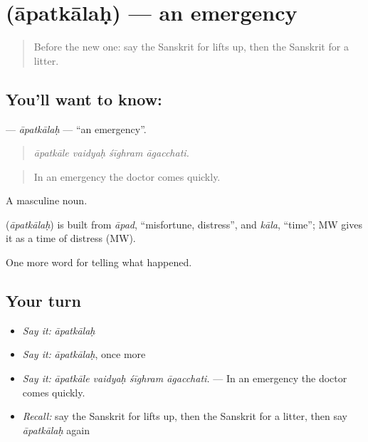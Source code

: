 \section[\texorpdfstring{\sk{आपत्कालः} (āpatkālaḥ)}{आपत्कालः (āpatkālaḥ)}]{ (āpatkālaḥ) — an emergency}

\label{lesson:SA-C295-apatkalah}



\begin{quote}
Before the new one: say the Sanskrit for lifts up, then the Sanskrit for a litter.
\end{quote}

\subsection*{You'll want to know: }
\textbf{} — \emph{āpatkālaḥ} — \textquotedblleft{}an emergency\textquotedblright{}.

\begin{quote}
   
\end{quote}

\begin{quote}
\emph{āpatkāle vaidyaḥ śīghram āgacchati.}
\end{quote}

\begin{quote}
In an emergency the doctor comes quickly.
\end{quote}

A masculine noun.

\begin{cousinweb}
\textbf{} (\emph{āpatkālaḥ}) is built from \emph{āpad}, \textquotedblleft{}misfortune, distress\textquotedblright{}, and \emph{kāla}, \textquotedblleft{}time\textquotedblright{}; MW gives it as a time of distress (MW).
\end{cousinweb}

\begin{grammarlens}[title={What you've built}]
One more word for telling what happened.
\end{grammarlens}

\subsection*{Your turn}
\begin{itemize}
\raggedright
  \item \emph{Say it:} \emph{āpatkālaḥ}
  \item \emph{Say it:} \emph{āpatkālaḥ}, once more
  \item \emph{Say it:} \emph{āpatkāle vaidyaḥ śīghram āgacchati.} — In an emergency the doctor comes quickly.
  \item \emph{Recall:} say the Sanskrit for lifts up, then the Sanskrit for a litter, then say \emph{āpatkālaḥ} again
\end{itemize}

